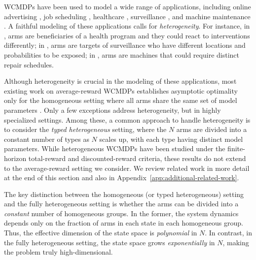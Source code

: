 \documentclass{article}
\theoremstyle{plain}
\theoremstyle{remark}
\begin{document}
WCMDPs have been used to model a wide range of applications, including online advertising \citep{boutilier2016budget,zhou2023rl}, job scheduling \citep{yu2018deadline}, healthcare \citep{biswas2021learning}, surveillance \citep{villar2016indexability}, and machine maintenance \citep{GlaMitAns_05_rb_repair}.
A faithful modeling of these applications calls for \emph{heterogeneity}.
For instance, in \citep{biswas2021learning}, arms are beneficiaries of a health program and they could react to interventions differently; in \citep{villar2016indexability}, arms are targets of surveillance who have different locations and probabilities to be exposed; in \citep{GlaMitAns_05_rb_repair}, arms are machines that could require distinct repair schedules.  


Although heterogeneity is crucial in the modeling of these applications, most existing work on average-reward WCMDPs establishes asymptotic optimality only for the homogeneous setting where all arms share the same set of model parameters
\citep{WebWei_90,Ver_16_verloop,GasGauYan_23_exponential,GasGauYan_23_whittles,HonXieChe_23,HonXieChe_24,hong2024exponential,Yan_24,HodGla_15,GolAvr_24_wcmdp_multichain}.
Only a few exceptions \citep{Ver_16_verloop,XioWanLi_22,HonXieChe_23} address heterogeneity, but in highly specialized settings.
Among these, a common approach to handle heterogeneity is to consider the \emph{typed heterogeneous} setting, where the $N$ arms are divided into a constant number of types as $N$ scales up, with each type having distinct model parameters.
While heterogeneous WCMDPs have been studied under the finite-horizon total-reward and discounted-reward criteria, these results do not extend to the average-reward setting we consider. 
We review related work in more detail at the end of this section and also in Appendix~\ref{app:additional-related-work}.

The key distinction between the homogeneous (or typed heterogeneous) setting and the fully heterogeneous setting is whether the arms can be divided into a \emph{constant} number of homogeneous groups.
In the former, the system dynamics depends only on the fraction of arms in each state in each homogeneous group.
Thus, the effective dimension of the state space is \emph{polynomial} in $N$.
In contrast, in the fully heterogeneous setting, the state space grows \emph{exponentially} in $N$, making the problem truly high-dimensional.
\end{document}

